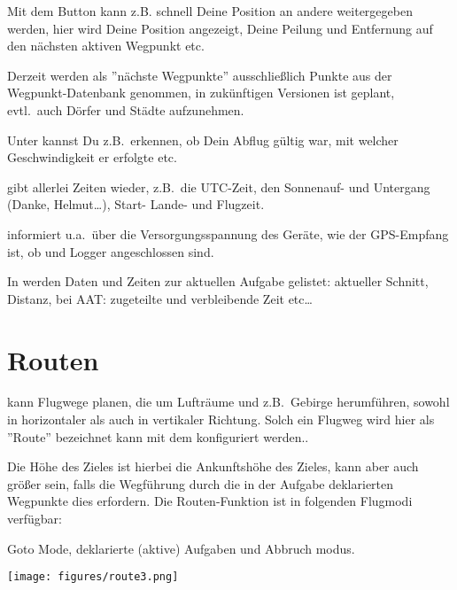 
Mit dem Button  kann z.B. schnell Deine Position an andere 
weitergegeben werden, hier wird Deine Position angezeigt, Deine Peilung und Entfernung auf den nächsten aktiven Wegpunkt etc. 


Derzeit werden als ''nächste Wegpunkte'' ausschließlich Punkte aus der Wegpunkt-Datenbank genommen, in zukünftigen Versionen ist geplant, evtl.\  auch Dörfer und Städte aufzunehmen.

Unter  kannst Du z.B.\ erkennen, ob Dein Abflug gültig war, mit welcher Geschwindigkeit er erfolgte etc.\ 

 gibt allerlei Zeiten wieder, z.B.\ die UTC-Zeit, den Sonnenauf- und Untergang (Danke, Helmut\dots), Start- Lande- und Flugzeit. 

 informiert u.a.\ über die Versorgungsspannung des Geräte, wie der GPS-Empfang ist, ob \fl und Logger angeschlossen sind. 

In  werden Daten und Zeiten zur aktuellen Aufgabe gelistet: aktueller Schnitt, Distanz, bei AAT: zugeteilte und verbleibende Zeit etc\dots 


\section{Routen}\label{sec:route}

\xc kann Flugwege planen, die um Lufträume und z.B.\ Gebirge herumführen, sowohl in 
horizontaler als auch in vertikaler Richtung. Solch ein Flugweg wird hier als ''Route'' bezeichnet kann mit dem  konfiguriert werden..

Die Höhe des Zieles ist hierbei die Ankunftshöhe des Zieles, kann aber auch größer sein, falls die Wegführung durch die in der Aufgabe deklarierten Wegpunkte dies erfordern. Die Routen-Funktion ist in folgenden Flugmodi verfügbar:

Goto Mode, deklarierte (aktive) Aufgaben und Abbruch modus.

\begin{center}
\texttt{[image: figures/route3.png]}
\end{center}

